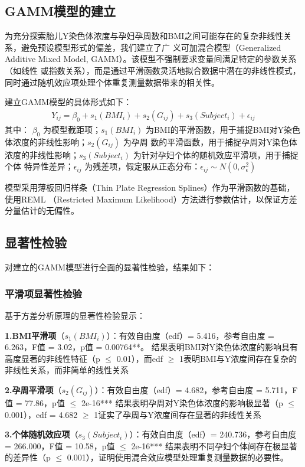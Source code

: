 \documentclass{article}
\begin{document}
\subsection{\textbf{GAMM模型的建立}}
为充分探索胎儿Y染色体浓度与孕妇孕周数和BMI之间可能存在的复杂非线性关系，避免预设模型形式的偏差，我们建立了广
义可加混合模型（Generalized Additive Mixed Model, GAMM）。该模型不强制要求变量间满足特定的参数关系（如线性
或指数关系），而是通过平滑函数灵活地拟合数据中潜在的非线性模式，同时通过随机效应项处理个体重复测量数据带来的相关性。

建立GAMM模型的具体形式如下：
\begin{gather}
    Y_{ij}=\beta_0+s_1(BMI_i)+s_2(G_{ij})+s_3(Subject_i)+\epsilon_{ij}\tag{3}
\end{gather}
其中：
$\beta_0$ 为模型截距项；$s_1(BMI_i)$ 为BMI的平滑函数，用于捕捉BMI对Y染色体浓度的非线性影响；$s_2(G_{ij})$ 为孕周
数的平滑函数，用于捕捉孕周对Y染色体浓度的非线性影响；$s_3(Subject_i)$ 为针对孕妇个体的随机效应平滑项，用于捕捉个体
特异性差异；$\epsilon_{ij}$ 为残差项，假定服从正态分布：$\epsilon_{ij} \sim N(0, \sigma^2_\epsilon)$

模型采用薄板回归样条（Thin Plate Regression Splines）作为平滑函数的基础，使用REML
（Restricted Maximum Likelihood）方法进行参数估计，以保证方差分量估计的无偏性。
\subsection{\textbf{显著性检验}}
对建立的GAMM模型进行全面的显著性检验，结果如下：

\subsubsection{\textbf{平滑项显著性检验}}
基于方差分析原理的显著性检验显示：

\textbf{1.BMI平滑项}（$s_1(BMI_i)$）：有效自由度（edf）= 5.416，参考自由度 = 6.263，F值 = 3.02，p值 = 0.00764**。
结果表明BMI对Y染色体浓度的影响具有高度显著的非线性特征（p $\leq$ 0.01），而edf $\geq$ 1表明BMI与Y浓度间存在复杂的非线性关系，而非简单的线性关系


\textbf{2.孕周平滑项}（$s_2(G_{ij})$）：有效自由度（edf）= 4.682，参考自由度 = 5.711，F值 = 77.86，p值 $\leq$ 2e-16***
结果表明孕周对Y染色体浓度的影响极显著（p $\leq$ 0.001），edf = 4.682 $\geq$ 1证实了孕周与Y浓度间存在显著的非线性关系

\textbf{3.个体随机效应项}（$s_3(Subject_i)$）：有效自由度（edf）= 240.736，参考自由度 = 266.000，F值 = 10.58，p值 $\leq$ 2e-16***
结果表明不同孕妇个体间存在极显著的差异性（p $\leq$ 0.001），证明使用混合效应模型处理重复测量数据的必要性。
\end{document}
